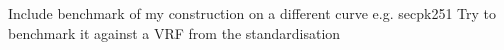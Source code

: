 Include benchmark of my construction on a different curve e.g. secpk251
Try to benchmark it against a VRF from the standardisation











